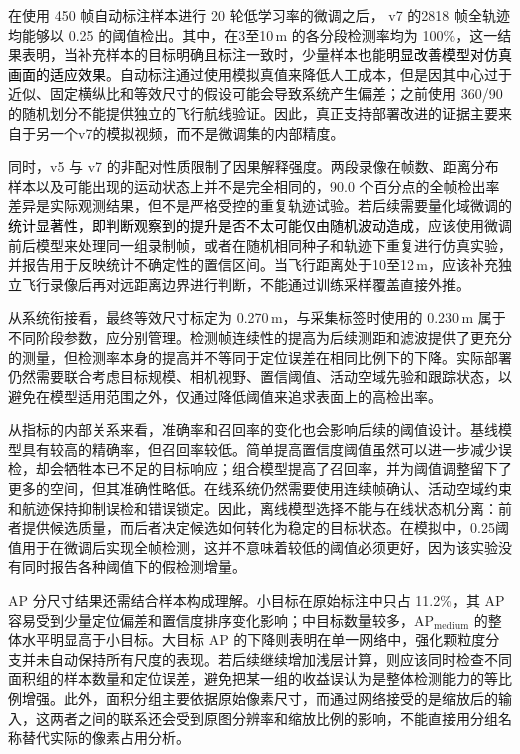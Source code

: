 在使用 450 帧自动标注样本进行 20 轮低学习率的微调之后， v7 的2818 帧全轨迹均能够以 0.25 的阈值检出。其中，在3至10\,m 的各分段检测率均为 100\%，这一结果表明，当补充样本的目标明确且标注一致时，少量样本也能\textcolor{black}{明显改善模型对仿真画面的适应效果}。自动标注通过使用模拟真值来降低人工成本，但是因其中心过于近似、固定横纵比和等效尺寸的假设可能会导致系统产生偏差；之前使用 360/90 的随机划分不能提供独立的飞行航线验证。因此，真正支持部署改进的证据主要来自于另一个v7的模拟视频，而不是微调集的内部精度。

同时，v5 与 v7 的非配对性质限制了因果解释强度。两段录像在帧数、距离分布样本以及可能出现的运动状态上并不是完全相同的，90.0 个百分点的全帧检出率差异是实际观测结果，但不是严格受控的重复轨迹试验。若后续需要量化域微调的\textcolor{black}{统计显著性，即判断观察到的提升是否不太可能仅由随机波动造成}，应该使用微调前后模型来处理同一组录制帧，或者在随机相同种子和轨迹下重复进行仿真实验，并报告用于反映统计不确定性的置信区间。当飞行距离处于10至12\,m，应该补充独立飞行录像后再对远距离边界进行判断，不能通过训练采样覆盖直接外推。

从系统衔接看，最终等效尺寸标定为 0.270\,m，与采集标签时使用的 0.230\,m 属于不同阶段参数，应分别管理。检测帧连续性的提高为后续测距和滤波提供了更充分的测量，但检测率本身的提高并不等同于定位误差在相同比例下的下降。实际部署仍然需要联合考虑目标规模、相机视野、置信阈值、活动空域先验和跟踪状态，以避免在模型适用范围之外，仅通过降低阈值来追求表面上的高检出率。

从指标的内部关系来看，准确率和召回率的变化也会影响后续的阈值设计。基线模型具有较高的精确率，但召回率较低。简单提高置信度阈值虽然可以进一步减少误检，却会牺牲本已不足的目标响应；组合模型提高了召回率，并为阈值调整留下了更多的空间，但其准确性略低。在线系统仍然需要使用连续帧确认、活动空域约束和航迹保持抑制误检和错误锁定。因此，离线模型选择不能与在线状态机分离：前者提供候选质量，而后者决定候选如何转化为稳定的目标状态。在模拟中，0.25阈值用于在微调后实现全帧检测，这并不意味着较低的阈值必须更好，因为该实验没有同时报告各种阈值下的假检测增量。

AP 分尺寸结果还需结合样本构成理解。小目标在原始标注中只占 11.2\%，其 AP 容易受到少量定位偏差和置信度排序变化影响；中目标数量较多，AP$_{\mathrm{medium}}$ 的整体水平明显高于小目标。大目标 AP 的下降则表明在单一网络中，强化颗粒度分支并未自动保持所有尺度的表现。若后续继续增加浅层计算，则应该同时检查不同面积组的样本数量和定位误差，避免把某一组的收益误认为是整体检测能力的等比例增强。此外，面积分组主要依据原始像素尺寸，而通过网络接受的是缩放后的输入，这两者之间的联系还会受到原图分辨率和缩放比例的影响，不能直接用分组名称替代实际的像素占用分析。

